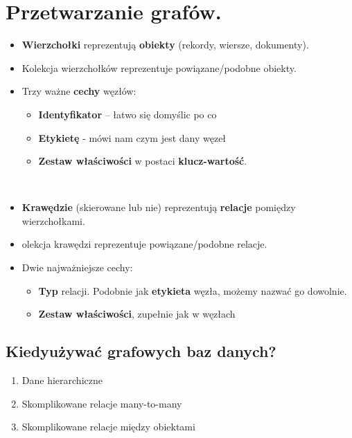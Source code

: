 \documentclass[a4paper]{article}
\begin{document}
    \section{Przetwarzanie grafów.}
    \begin{itemize}[noitemsep]
        \item \textbf{Wierzchołki} reprezentują \textbf{obiekty} (rekordy, wiersze, dokumenty).
        \item Kolekcja wierzchołków reprezentuje powiązane/podobne obiekty.
        \item Trzy ważne \textbf{cechy} węzłów:
        \begin{itemize}[noitemsep]
            \item \textbf{Identyfikator} – łatwo się domyślic po co
            \item \textbf{Etykietę} - mówi nam czym jest dany węzeł
            \item \textbf{Zestaw właściwości} w postaci \textbf{klucz-wartość}.
        \end{itemize}
        \hfill \\

        \item \textbf{Krawędzie} (skierowane lub nie) reprezentują \textbf{relacje} pomiędzy wierzchołkami.
        \item olekcja krawędzi reprezentuje powiązane/podobne relacje.
        \item Dwie najważniejsze cechy:
        \begin{itemize}[noitemsep]
            \item \textbf{Typ} relacji. Podobnie jak \textbf{etykieta} węzła, możemy nazwać go dowolnie.
            \item \textbf{Zestaw właściwości}, zupełnie jak w węzłach
        \end{itemize}
    \end{itemize}

    \subsection{Kiedyużywać grafowych baz danych?}
    \begin{enumerate}
        \item Dane hierarchiczne
        \item Skomplikowane relacje many-to-many
        \item Skomplikowane relacje między obiektami
    \end{enumerate}
\end{document}
